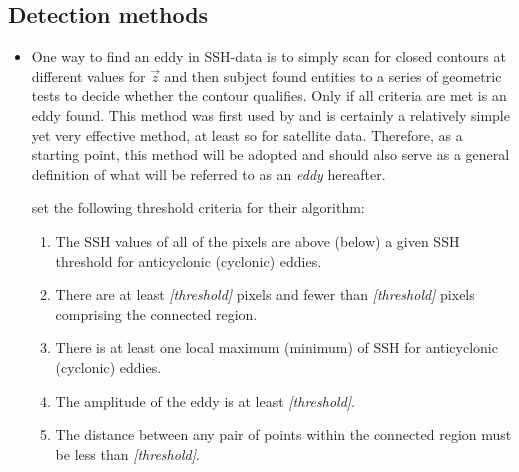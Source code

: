 \subsection{Detection methods} \label{subsec:detectmethods}
\begin{itemize}

	\item
	One way to find an eddy in SSH-data is to simply scan for closed contours at different values for $\vec{z}$ and then subject found entities to a series of geometric tests to decide whether the contour qualifies. Only if all criteria are met is an eddy found. This method was first used by \citet{Chelton2011} and is certainly a relatively simple yet very effective method, at least so for satellite data. Therefore, as a starting point, this method will be adopted and should also serve as a general definition of what will be referred to as an \textit{eddy} hereafter.
	
 set the following threshold criteria for their algorithm:
	\begin{enumerate}
		\item
		The SSH values of all of the pixels are above (below) a given SSH threshold for anticyclonic (cyclonic) eddies.
		\item
		There are at least \textit{[threshold]} pixels and fewer than \textit{[threshold]} pixels comprising the connected region.
		\item
		There is at least one local maximum (minimum) of SSH for anticyclonic (cyclonic) eddies.
		\item
		The amplitude of the eddy is at least \textit{[threshold]}.
		\item
		The distance between any pair of points within the connected region must be less than \textit{[threshold]}.
	\end{enumerate}


\end{itemize}
